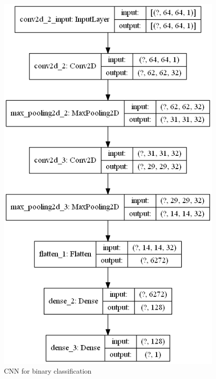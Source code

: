 \documentclass{article}
\begin{document}
\begin{figure}
   \centering
    \includegraphics[totalheight=8cm]{circle_id/binary_model.png}
  \caption{\label{fig:binary_model} CNN for binary classification}
\end{figure}
%
\end{document}

